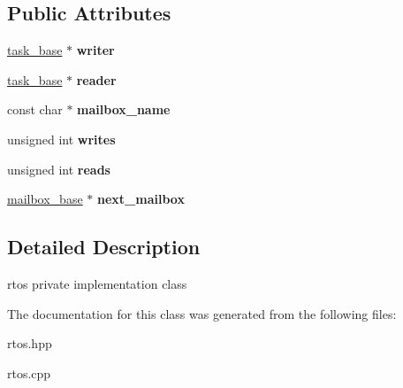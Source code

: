 \subsection*{Public Attributes}
\begin{DoxyCompactItemize}
\item 
\hyperlink{classrtos_1_1task__base}{task\+\_\+base} $\ast$ {\bfseries writer}\hypertarget{classrtos_1_1mailbox__base_ab6916cbb6931c728a256cb59b86a19ad}{}\label{classrtos_1_1mailbox__base_ab6916cbb6931c728a256cb59b86a19ad}

\item 
\hyperlink{classrtos_1_1task__base}{task\+\_\+base} $\ast$ {\bfseries reader}\hypertarget{classrtos_1_1mailbox__base_aacbf86c2dc3d6a3cb19ab3b32a86ead8}{}\label{classrtos_1_1mailbox__base_aacbf86c2dc3d6a3cb19ab3b32a86ead8}

\item 
const char $\ast$ {\bfseries mailbox\+\_\+name}\hypertarget{classrtos_1_1mailbox__base_ad6c99f06c6ae8662b40090040e51f6f5}{}\label{classrtos_1_1mailbox__base_ad6c99f06c6ae8662b40090040e51f6f5}

\item 
unsigned int {\bfseries writes}\hypertarget{classrtos_1_1mailbox__base_a5350e3d0a6d0969c917a630a8255f9f6}{}\label{classrtos_1_1mailbox__base_a5350e3d0a6d0969c917a630a8255f9f6}

\item 
unsigned int {\bfseries reads}\hypertarget{classrtos_1_1mailbox__base_a7d7437c03cca4719cc0c29212c0fc52f}{}\label{classrtos_1_1mailbox__base_a7d7437c03cca4719cc0c29212c0fc52f}

\item 
\hyperlink{classrtos_1_1mailbox__base}{mailbox\+\_\+base} $\ast$ {\bfseries next\+\_\+mailbox}\hypertarget{classrtos_1_1mailbox__base_a3a47e8e62c65ae5f4a0fef12d1bce40b}{}\label{classrtos_1_1mailbox__base_a3a47e8e62c65ae5f4a0fef12d1bce40b}

\end{DoxyCompactItemize}


\subsection{Detailed Description}
rtos private implementation class 

The documentation for this class was generated from the following files\+:\begin{DoxyCompactItemize}
\item 
rtos.\+hpp\item 
rtos.\+cpp\end{DoxyCompactItemize}

